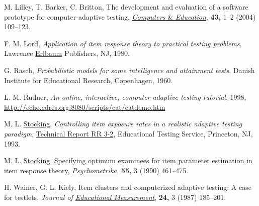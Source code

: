 \documentclass[11pt,twoside]{article}
\begin{document}
\begin{thebibliography}{99}
M. Lilley, T. Barker, C.  Britton, The development and evaluation of a software prototype for computer-adaptive testing, \href{http://www.sciencedirect.com/science/journal/03601315}{\textit{Computers} \& \textit{Education}}, \textbf{43,} 1--2 (2004) 109--123.

 F. M. Lord, \textit{Application of item response theory to practical testing problems}, Lawrence \href{http://www.erlbaum.com/}{Erlbaum} Publishers,  NJ, 1980. 

 G. Rasch, \textit{Probabilistic models for some intelligence and attainment tests}, Danish Institute for Educational Research,  Copenhagen, 1960.

 L. M. Rudner,  \textit{An online, interactive, computer adaptive testing tutorial}, 1998, \href{http://echo.edres.org:8080/scripts/cat/catdemo.htm} {http://echo.edres.org:8080/scripts/cat/catdemo.htm} 

 M. L. \href{http://apm.sagepub.com/content/31/3/167.extract}{Stocking}, \textit{Controlling item exposure rates in a realistic adaptive testing paradigm}, \href{http://www.eric.ed.gov/PDFS/ED384663.pdf}{Technical Report RR 3-2},  Educational Testing Service, Princeton, NJ, 1993.

 M. L.  \href{http://apm.sagepub.com/content/31/3/167.extract}{Stocking},  Specifying optimum examinees for item parameter estimation in item response theory, \textit{\href{ttp://www.psychometrika.org/journal/Psychometrika.html}{Psychometrika}},  \textbf{55,} 3 (1990) 461--475.

H. Wainer, G. L. Kiely,  Item clusters and computerized adaptive testing: A case for testlets,   \textit{Journal of \href{http://www.blackwellpublishing.com/journal.asp?ref=0022-0655}{Educational Measurement}},  \textbf{24,} 3 (1987) 185--201.


\end{thebibliography}



\bigskip
{} 
\end{document}

